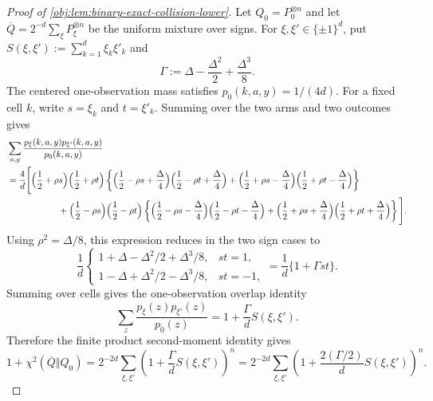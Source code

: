 \begin{proof}[Proof of \cref{obj:lem:binary-exact-collision-lower}]
Let \(Q_0=P_0^{\otimes n}\) and let \(\overline Q=2^{-d}\sum_\xi P_\xi^{\otimes n}\) be the uniform mixture over signs.  For \(\xi,\xi'\in\{\pm1\}^d\), put \(S(\xi,\xi'):=\sum_{k=1}^d \xi_k\xi'_k\) and
\[
\Gamma:=\Delta-\frac{\Delta^2}{2}+\frac{\Delta^3}{8}.
\]
The centered one-observation mass satisfies \(p_0(k,a,y)=1/(4d)\).  For a fixed cell \(k\), write \(s=\xi_k\) and \(t=\xi'_k\).  Summing over the two arms and two outcomes gives
\[
\begin{aligned}
&\sum_{a,y}\frac{p_\xi(k,a,y)p_{\xi'}(k,a,y)}{p_0(k,a,y)} \\
&=\frac4d\Bigg[
\Big(\frac12+\rho s\Big)\Big(\frac12+\rho t\Big)
\left\{
\Big(\frac12-\rho s+\frac\Delta4\Big)
\Big(\frac12-\rho t+\frac\Delta4\Big)
+
\Big(\frac12+\rho s-\frac\Delta4\Big)
\Big(\frac12+\rho t-\frac\Delta4\Big)
\right\} \\
&\hspace{2.0cm}+
\Big(\frac12-\rho s\Big)\Big(\frac12-\rho t\Big)
\left\{
\Big(\frac12-\rho s-\frac\Delta4\Big)
\Big(\frac12-\rho t-\frac\Delta4\Big)
+
\Big(\frac12+\rho s+\frac\Delta4\Big)
\Big(\frac12+\rho t+\frac\Delta4\Big)
\right\}\Bigg].
\end{aligned}
\]
Using \(\rho^2=\Delta/8\), this expression reduces in the two sign cases to
\[
\frac1d
\begin{cases}
1+\Delta-\Delta^2/2+\Delta^3/8, & st=1,\\
1-\Delta+\Delta^2/2-\Delta^3/8, & st=-1,
\end{cases}
=\frac1d\{1+\Gamma st\}.
\]
Summing over cells gives the one-observation overlap identity
\[
\sum_z\frac{p_\xi(z)p_{\xi'}(z)}{p_0(z)}
=
1+\frac{\Gamma}{d}S(\xi,\xi').
\]
Therefore the finite product second-moment identity gives
\[
1+\chi^2(\overline Q\Vert Q_0)
=
2^{-2d}\sum_{\xi,\xi'}
\left(1+\frac{\Gamma}{d}S(\xi,\xi')\right)^n
=
2^{-2d}\sum_{\xi,\xi'}
\left(1+\frac{2(\Gamma/2)}{d}S(\xi,\xi')\right)^n .
\] %


\end{proof}
